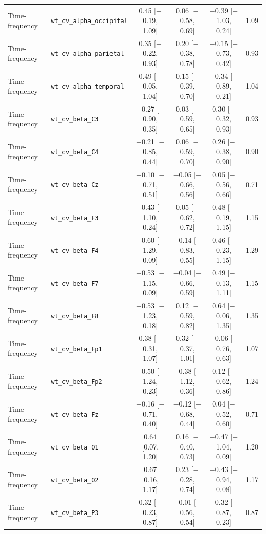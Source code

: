 {\begin{longtable}{llcccc}
Time-frequency & \texttt{wt\_cv\_alpha\_occipital} & 0.45 [$-$0.19, 1.09] & 0.06 [$-$0.58, 0.69] & $-$0.39 [$-$1.03, 0.24] & 1.09 \\
Time-frequency & \texttt{wt\_cv\_alpha\_parietal} & 0.35 [$-$0.22, 0.93] & 0.20 [$-$0.38, 0.78] & $-$0.15 [$-$0.73, 0.42] & 0.93 \\
Time-frequency & \texttt{wt\_cv\_alpha\_temporal} & 0.49 [$-$0.05, 1.04] & 0.15 [$-$0.39, 0.70] & $-$0.34 [$-$0.89, 0.21] & 1.04 \\
Time-frequency & \texttt{wt\_cv\_beta\_C3} & $-$0.27 [$-$0.90, 0.35] & 0.03 [$-$0.59, 0.65] & 0.30 [$-$0.32, 0.93] & 0.93 \\
Time-frequency & \texttt{wt\_cv\_beta\_C4} & $-$0.21 [$-$0.85, 0.44] & 0.06 [$-$0.59, 0.70] & 0.26 [$-$0.38, 0.90] & 0.90 \\
Time-frequency & \texttt{wt\_cv\_beta\_Cz} & $-$0.10 [$-$0.71, 0.51] & $-$0.05 [$-$0.66, 0.56] & 0.05 [$-$0.56, 0.66] & 0.71 \\
Time-frequency & \texttt{wt\_cv\_beta\_F3} & $-$0.43 [$-$1.10, 0.24] & 0.05 [$-$0.62, 0.72] & 0.48 [$-$0.19, 1.15] & 1.15 \\
Time-frequency & \texttt{wt\_cv\_beta\_F4} & $-$0.60 [$-$1.29, 0.09] & $-$0.14 [$-$0.83, 0.55] & 0.46 [$-$0.23, 1.15] & 1.29 \\
Time-frequency & \texttt{wt\_cv\_beta\_F7} & $-$0.53 [$-$1.15, 0.09] & $-$0.04 [$-$0.66, 0.59] & 0.49 [$-$0.13, 1.11] & 1.15 \\
Time-frequency & \texttt{wt\_cv\_beta\_F8} & $-$0.53 [$-$1.23, 0.18] & 0.12 [$-$0.59, 0.82] & 0.64 [$-$0.06, 1.35] & 1.35 \\
Time-frequency & \texttt{wt\_cv\_beta\_Fp1} & 0.38 [$-$0.31, 1.07] & 0.32 [$-$0.37, 1.01] & $-$0.06 [$-$0.76, 0.63] & 1.07 \\
Time-frequency & \texttt{wt\_cv\_beta\_Fp2} & $-$0.50 [$-$1.24, 0.23] & $-$0.38 [$-$1.12, 0.36] & 0.12 [$-$0.62, 0.86] & 1.24 \\
Time-frequency & \texttt{wt\_cv\_beta\_Fz} & $-$0.16 [$-$0.71, 0.40] & $-$0.12 [$-$0.68, 0.44] & 0.04 [$-$0.52, 0.60] & 0.71 \\
Time-frequency & \texttt{wt\_cv\_beta\_O1} & 0.64 [0.07, 1.20] & 0.16 [$-$0.40, 0.73] & $-$0.47 [$-$1.04, 0.09] & 1.20 \\
Time-frequency & \texttt{wt\_cv\_beta\_O2} & 0.67 [0.16, 1.17] & 0.23 [$-$0.28, 0.74] & $-$0.43 [$-$0.94, 0.08] & 1.17 \\
Time-frequency & \texttt{wt\_cv\_beta\_P3} & 0.32 [$-$0.23, 0.87] & $-$0.01 [$-$0.56, 0.54] & $-$0.32 [$-$0.87, 0.23] & 0.87 \\

\end{longtable}}
